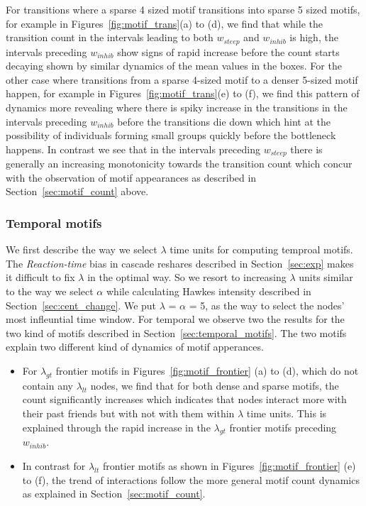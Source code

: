 \documentclass[smallextended]{svjour3}       %
\theoremstyle{definition}
\begin{document}
For transitions where a sparse 4 sized motif transitions into sparse 5 sized motifs, for example in Figures~\ref{fig:motif_trans}(a) to (d), we find that while the transition count in the intervals leading to both $w_{steep}$ and $w_{inhib}$ is high, the intervals preceding $w_{inhib}$ show signs of rapid increase before the count starts decaying shown by similar dynamics of the mean values in the boxes. For the other case where transitions from a sparse 4-sized motif to a denser 5-sized motif happen, for example in Figures~\ref{fig:motif_trans}(e) to (f), we find this pattern of dynamics more revealing where there is spiky increase in the transitions in the intervals preceding $w_{inhib}$ before the transitions die down which hint at the possibility of individuals forming small groups quickly before the bottleneck happens. In contrast we see that in the intervals preceding $w_{steep}$ there is generally an increasing monotonicity towards the transition count which concur with the observation of motif appearances as described in Section~\ref{sec:motif_count} above.

\subsubsection{Temporal motifs}
We first describe the way we select $\lambda $ time units for computing temproal motifs. The \textit{Reaction-time} bias in cascade reshares described in Section~\ref{sec:exp}  makes it difficult to fix $\lambda$ in the optimal way. So we resort to increasing $\lambda$ units similar to the way we select $\alpha$ while calculating Hawkes intensity described in Section~\ref{sec:cent_change}. We put $\lambda$ = $\alpha$ = 5, as the way to select the nodes' most infleuntial time window. For temporal we observe two the results for the two kind of motifs described in Section~\ref{sec:temporal_motifs}. The two motifs explain two different kind of dynamics of motif apperances. 

\begin{itemize}
	\item For $\lambda_{gt}$ frontier motifs in Figures~\ref{fig:motif_frontier} (a) to (d), which do not contain any $\lambda_{lt}$ nodes, we find that for both dense and sparse motifs, the count significantly increases which indicates that nodes interact more with their past friends but with not with them within $\lambda $ time units. This is explained through the rapid increase in the  $\lambda_{gt}$ frontier motifs preceding $w_{inhib}$.
		
	\item In contrast for $\lambda_{lt}$ frontier motifs as shown in  Figures~\ref{fig:motif_frontier} (e) to (f), the trend of interactions follow the more general motif count dynamics as explained in Section~\ref{sec:motif_count}.
	
\end{itemize}
 
\end{document}
